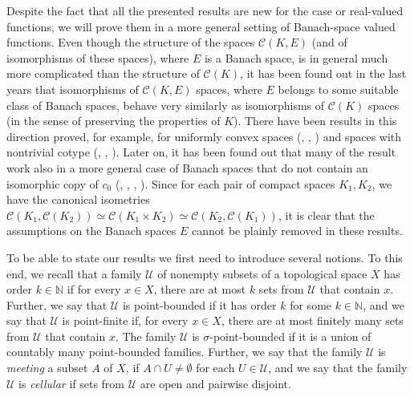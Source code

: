 \documentclass{amsart}
\numberwithin{equation}{section}
\theoremstyle{definition}
\def\C{\mathcal C}
\def\en{\mathbb N}
\begin{document}
Despite the fact that all the presented results are new for the case or real-valued functions, we will prove them in a more general setting of Banach-space valued functions. Even though the structure of the spaces $\C(K, E)$ (and of isomorphisms of these spaces), where $E$ is a Banach space, is in general much more complicated than the structure of $\C(K)$, it has been found out in the last years that isomorphisms of $\C(K, E)$ spaces, where $E$ belongs to some suitable class of Banach spaces, behave very similarly as isomorphisms of $\C(K)$ spaces (in the sense of preserving the properties of $K$). There have been results in this direction proved, for example, for uniformly convex spaces (\cite{cambern-pacific}, \cite{Galego_classification}, \cite{GALEGO_Zahn_classification}) and spaces with nontrivial cotype (\cite{CandidoGalegoCotype}, \cite{candidogalego}, \cite{Galego_Zahn_dichotomy}). Later on, it has been found out that many of the result work also in a more general case of Banach spaces that do not contain an isomorphic copy of $c_0$ (\cite{CANDIDOc0}, \cite{GalegoVillamizar}, \cite{CandidoScattered}, \cite{rondos-somaglia}). 
Since for each pair of compact spaces $K_1, K_2$, we have the canonical isometries $\C(K_1, \C(K_2)) \simeq \C(K_1 \times K_2) \simeq \C(K_2, \C(K_1))$, it is clear that the assumptions on the Banach spaces $E$ cannot be plainly removed in these results.

To be able to state our results we first need to introduce several notions. To this end, we recall that a family $\mathcal{U}$ of nonempty subsets of a topological space $X$ has order $k \in \en$ if for every $x \in X$, there are at most $k$ sets from $\mathcal{U}$ that contain $x$. Further, we say that $\mathcal{U}$ is point-bounded if it has order $k$ for some $k \in \en$, and we say that $\mathcal{U}$ is point-finite if, for every $x \in X$, there are at most finitely many sets from $\mathcal{U}$ that contain $x$. The family $\mathcal{U}$ is $\sigma$-point-bounded if it is a union of countably many point-bounded families. Further, we say that the family $\mathcal{U}$ is \emph{meeting} a subset $A$ of $X$, if $A \cap U \neq \emptyset$ for each $U \in \mathcal{U}$, and we say that the family $\mathcal{U}$ is \emph{cellular} if sets from $\mathcal{U}$ are open and pairwise disjoint.
\end{document}

